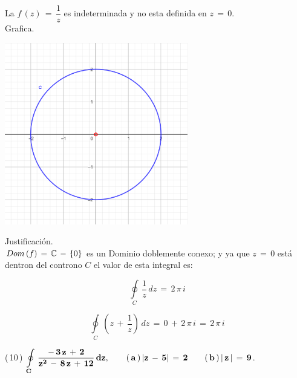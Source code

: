 \documentclass[a4paper,11pt,openany]{book}
\begin{document}
\begin{tcolorbox}[colback=ao(english)!5!white,colframe=ao(english)!75!black,fonttitle=\bfseries,title=\sf $I_{2}$]

La $f\,(z)\,=\,\dfrac{1}{z}$ es indeterminada y no esta definida en $z\,=\,0$.\\

\textcolor{ao(english)}{} Grafica.

\begin{center}
     \includegraphics[width=8cm]{Gra-Ej-9-2.png}
\end{center}

\textcolor{ao(english)}{} Justificación.\\

$\mathnormal{Dom\,(f)}\,=\,\mathbb C\,-\,\{0\}$ es un Dominio doblemente conexo; y ya que $z\,=\,0$ está dentron del controno $C$ el valor de esta integral es:

$$\displaystyle\oint\limits_{C}\,\dfrac{1}{z}\,dz\,=\,2\,\pi\,i$$

\end{tcolorbox}

$$\displaystyle\oint\limits_{C}\,(z\,+\,\dfrac{1}{z})\,dz\,=\,0\,+\,2\,\pi\,i\,=\,2\,\pi\,i$$

\textcolor{ao(english)}{(\,10\,)} $\bf{\displaystyle\oint\limits_{C}\,\dfrac{-\,3\,z\,+\,2}{z^{2}\,-\,8\,z\,+\,12}\,dz}, \qquad (\,a\,)\,|z\,-\,5|\,=\,2 \qquad (\,b\,)\,|\,z\,|\,=\,9$.
\end{document}
